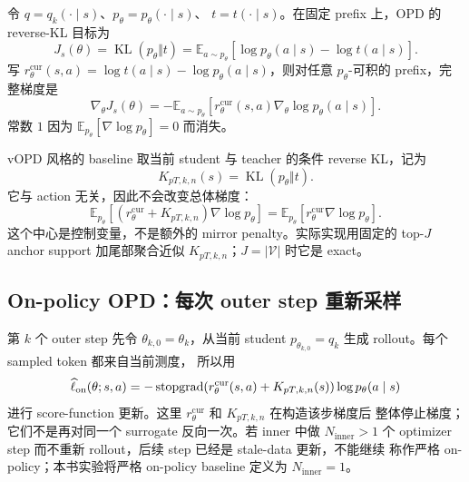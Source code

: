 令 $q=q_k(\cdot\mid s)$、$p_\theta=p_\theta(\cdot\mid s)$、 $t=t(\cdot\mid s)$。在固定 prefix 上，OPD 的 reverse-KL 目标为
\begin{equation}
\label{eq:ch2-opd-baseline-objective}
J_s(\theta)=\operatorname{KL}(p_\theta\Vert t)
 =\mathbb E_{a\sim p_\theta}
 \left[\log p_\theta(a\mid s)-\log t(a\mid s)\right].
\end{equation}
写 $r_\theta^{\mathrm{cur}}(s,a)=\log t(a\mid s)-\log p_\theta(a\mid s)$，则对任意 $p_\theta$-可积的 prefix，完整梯度是
\begin{equation}
\label{eq:ch2-opd-baseline-gradient}
\nabla_\theta J_s(\theta)
 =-\mathbb E_{a\sim p_\theta}
 \left[r_\theta^{\mathrm{cur}}(s,a)\nabla_\theta\log p_\theta(a\mid s)\right].
\end{equation}
常数 $1$ 因为 $\mathbb E_{p_\theta}[\nabla\log p_\theta]=0$ 而消失。

vOPD 风格的 baseline 取当前 student 与 teacher 的条件 reverse KL，记为
\begin{equation}
\label{eq:ch2-opd-vopd-center}
 K_{pT,k,n}(s)=\operatorname{KL}(p_\theta\Vert t).
\end{equation}
它与 action 无关，因此不会改变总体梯度：
\begin{equation}
\mathbb E_{p_\theta}[(r_\theta^{\mathrm{cur}}+K_{pT,k,n})\nabla\log p_\theta]
 =\mathbb E_{p_\theta}[r_\theta^{\mathrm{cur}}\nabla\log p_\theta].
\end{equation}
这个中心是控制变量，不是额外的 mirror penalty。实际实现用固定的 top-$J$ anchor support 加尾部聚合近似 $K_{pT,k,n}$；$J=|\mathcal V|$ 时它是 exact。

\subsection{On-policy OPD：每次 outer step 重新采样}
\label{subsec:ch2-opd-onpolicy-baseline}

第 $k$ 个 outer step 先令 $\theta_{k,0}=\theta_k$，从当前 student $p_{\theta_{k,0}}=q_k$ 生成 rollout。每个 sampled token 都来自当前测度， 所以用
\begin{equation}
\widehat\ell_{\mathrm{on}}(\theta;s,a)
 =-\operatorname{stopgrad}\!\left(r_\theta^{\mathrm{cur}}(s,a)+K_{pT,k,n}(s)\right)
 \log p_\theta(a\mid s)
\end{equation}
进行 score-function 更新。这里 $r_\theta^{\mathrm{cur}}$ 和 $K_{pT,k,n}$ 在构造该步梯度后 整体停止梯度；它们不是再对同一个 surrogate 反向一次。若 inner 中做 $N_{\mathrm{inner}}>1$ 个 optimizer step 而不重新 rollout，后续 step 已经是 stale-data 更新，不能继续 称作严格 on-policy；本书实验将严格 on-policy baseline 定义为 $N_{\mathrm{inner}}=1$。

